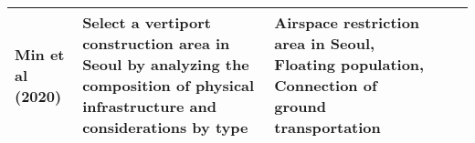\begin{longtable}[c]{@{}lllll@{}}
    Min et al (2020) & \parbox[t]{5cm}{Select a vertiport construction area in Seoul by analyzing the composition of physical infrastructure and considerations by type \citep{Min-2020}\\} & \parbox[t]{5cm}{\raggedright Airspace restriction area in Seoul, Floating population, Connection of ground transportation} \\* \bottomrule
\end{longtable}
